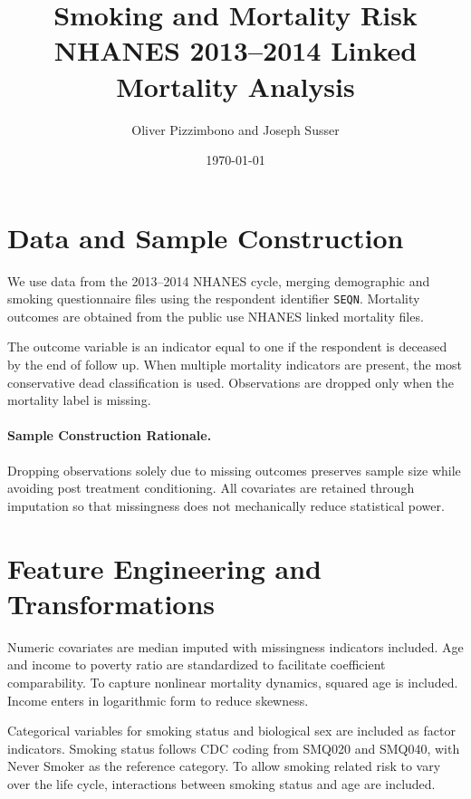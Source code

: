 \documentclass[12pt]{article}
\title{\textbf{Smoking and Mortality Risk}\\
NHANES 2013--2014 Linked Mortality Analysis}
\author{Oliver Pizzimbono and Joseph Susser}
\date{\today}
\newcommand{\centertableinput}[1]{%
\begin{table}[H]
\centering

\end{table}
}
\begin{document}
\maketitle

\section{Data and Sample Construction}

We use data from the 2013--2014 NHANES cycle, merging demographic and smoking questionnaire files using the respondent identifier \texttt{SEQN}. Mortality outcomes are obtained from the public use NHANES linked mortality files.

The outcome variable is an indicator equal to one if the respondent is deceased by the end of follow up. When multiple mortality indicators are present, the most conservative dead classification is used. Observations are dropped only when the mortality label is missing.

\centertableinput{tables/data_overview.tex}

\paragraph{Sample Construction Rationale.}

Dropping observations solely due to missing outcomes preserves sample size while avoiding post treatment conditioning. All covariates are retained through imputation so that missingness does not mechanically reduce statistical power.

\FloatBarrier

\section{Feature Engineering and Transformations}

Numeric covariates are median imputed with missingness indicators included. Age and income to poverty ratio are standardized to facilitate coefficient comparability. To capture nonlinear mortality dynamics, squared age is included. Income enters in logarithmic form to reduce skewness.

Categorical variables for smoking status and biological sex are included as factor indicators. Smoking status follows CDC coding from SMQ020 and SMQ040, with Never Smoker as the reference category. To allow smoking related risk to vary over the life cycle, interactions between smoking status and age are included.
\end{document}
